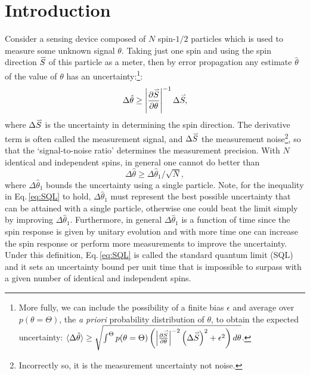 \documentclass[reqno]{amsart}
\def\be{\begin{equation}}
\def\ee{\end{equation}}
\def\est#1{\hat{#1}}
\newcommand{\myvec}[1]{\accentset{\rightharpoonup}{#1}}
\begin{document}
\section*{Introduction}
Consider a sensing device composed of $N$ spin-$1/2$ particles which is used to measure some unknown signal $\theta$. %
Taking just one spin and using the spin direction $\myvec{S}$ of this particle as a meter, then by error propagation any estimate $\est{\theta}$ of the value of $\theta$ has an uncertainty:\footnote{More fully, we can include the possibility of a finite bias $\epsilon$ and average over $p(\theta = \Theta)$, the \emph{a priori} probability distribution of $\theta$, to obtain the expected uncertainty: $\langle \Delta \est{\theta}\rangle \geq \sqrt{\int^{\Theta} p(\theta = \Theta)\left( \left| \frac{\partial \myvec{S}}{\partial \theta} \right|^{-2} \left(\Delta \myvec{S}\right)^2+\epsilon^2\right) d\theta}$.}:
\be
\Delta \est{\theta} \geq \left| \frac{\partial \myvec{S}}{\partial \theta} \right|^{-1} \Delta \myvec{S}, %
\label{eq:SNR}
\ee
where $\Delta \myvec{S}$ is the uncertainty in determining the spin direction. The derivative term is often called the measurement signal, and $\Delta \myvec{S}$ %
the measurement noise\footnote{Incorrectly so, it is the measurement uncertainty not noise.}, so that the `signal-to-noise ratio' determines the measurement precision. With $N$ identical and independent spins, in general one cannot do better than
\be
\Delta \est{\theta} \geq \Delta \est{\theta}_1 / \sqrt{N}, \label{eq:SQL}
\ee
where $\Delta \est{\theta}_1$ bounds the uncertainty using a single particle. Note, for the inequality in Eq.\,\eqref{eq:SQL} to hold, $\Delta \est{\theta}_1$ must represent the best possible uncertainty that can be attained with a single particle, otherwise one could beat the limit simply by improving $\Delta \est{\theta}_1$. Furthermore, in general $\Delta \est{\theta}_1$ is a function of time since the spin response is given by unitary evolution and with more time one can increase the spin response or perform more measurements to improve the uncertainty. Under this definition, Eq.\,\eqref{eq:SQL} is called the standard quantum limit (SQL) and it sets an uncertainty bound per unit time that is impossible to surpass with a given number of identical and independent spins.
\end{document}

